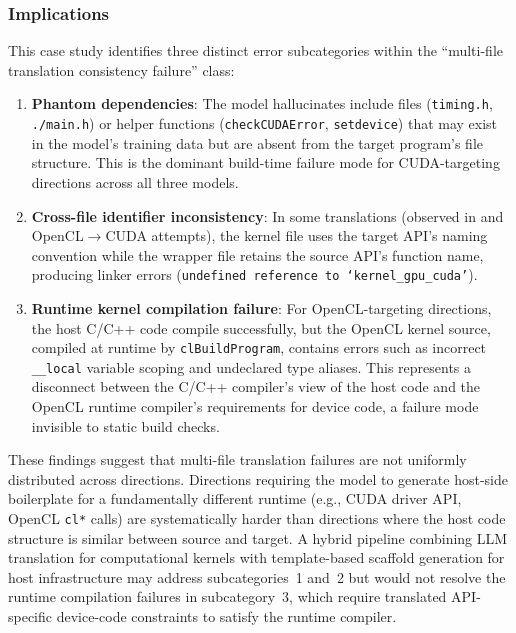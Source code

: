 \subsubsection*{Implications} 
This case study identifies three distinct error subcategories within the ``multi-file translation consistency failure'' class:
\begin{enumerate}
  \item \textbf{Phantom dependencies}: The model hallucinates include files (\texttt{timing.h}, \texttt{./main.h}) or helper functions (\texttt{checkCUDAError}, \texttt{setdevice}) that may exist in the model's training data but are absent from the target program's file structure. This is the dominant build-time failure mode for CUDA-targeting directions across all three models.
    
    \item \textbf{Cross-file identifier inconsistency}: In some translations (observed in \codex{} and \gptnew{} OpenCL$\to$CUDA attempts), the kernel file uses the target API's naming convention while the wrapper file retains the source API's function name, producing linker errors (\texttt{undefined reference to `kernel\_gpu\_cuda'}).
    
    \item \textbf{Runtime kernel compilation failure}: For OpenCL-targeting directions, the host C/C++ code compile successfully, but the OpenCL kernel source, compiled at runtime by \texttt{clBuildProgram}, contains errors such as incorrect \texttt{\_\_local} variable scoping and undeclared type aliases. This represents a disconnect between the C/C++ compiler's view of the host code and the OpenCL runtime compiler's requirements for device code, a failure mode invisible to static build checks.
\end{enumerate}

These findings suggest that multi-file translation failures are not uniformly distributed across directions. Directions requiring the model to generate host-side boilerplate for a fundamentally different runtime (e.g., CUDA driver API, OpenCL \texttt{cl*} calls) are systematically harder than directions where the host code structure is similar between source and target. A hybrid pipeline combining LLM translation for computational kernels with template-based scaffold generation for host infrastructure may address subcategories~1 and~2 but would not resolve the runtime compilation failures in subcategory~3, which require translated API-specific device-code constraints to satisfy the runtime compiler.

